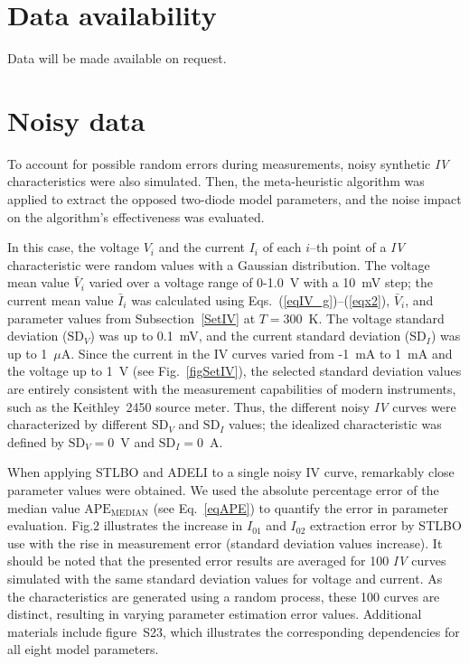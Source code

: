 \documentclass[a4paper,fleqn]{cas-sc}
\begin{document}
\section*{Data availability}
Data will be made available on request.


\appendix

\section{Noisy data}\label{Noisy}

To account for possible random errors during measurements, 
noisy synthetic \emph{IV} characteristics were also simulated.
Then, the meta-heuristic algorithm was applied to extract the opposed two-diode model parameters, 
and the noise impact on the algorithm's effectiveness was evaluated.

In this case, the voltage $V_i$ and the
current $I_i$ of each $i$--th point of a \emph{IV} characteristic were random values with a Gaussian distribution. 
The voltage mean value $\bar{V}_i$ varied over a voltage range of 0-1.0~V with a 10~mV step; 
the current mean value $\bar{I}_i$ was calculated using Eqs.~(\ref{eqIV_g})--(\ref{eqx2}), $\bar{V}_i$, 
and parameter values from Subsection~\ref{SetIV} at $T = 300$~K.
The voltage standard deviation ($\mathrm{SD}_V$) was up to 0.1~mV, 
and the current standard deviation ($\mathrm{SD}_I$) was up to 1~$\mu$A.
Since the current in the IV curves varied from -1~mA to 1~mA 
and the voltage up to 1~V (see Fig.~\ref{figSetIV}), the selected standard deviation values are entirely consistent 
with the measurement capabilities of modern instruments, such as the Keithley~2450 source meter.
Thus, the different noisy \emph{IV} curves were characterized by different $\mathrm{SD}_V$ and $\mathrm{SD}_I$ values; 
the idealized characteristic was defined by $\mathrm{SD}_V=0$~V and $\mathrm{SD}_I=0$~A.

When applying STLBO and ADELI to a single noisy IV curve, remarkably close parameter values were obtained.
We used the absolute percentage error of the median value $\mathrm{APE}_\mathrm{MEDIAN}$ 
(see Eq.~\ref{eqAPE}) to quantify the error in parameter evaluation.
Fig.2 illustrates the increase in $I_{01}$ and $I_{02}$ extraction error by STLBO use
with the rise in measurement error (standard deviation values increase).
It should be noted that the presented error results are averaged for 100 \emph{IV} curves 
simulated with the same standard deviation values for voltage and current. 
As the characteristics are generated using a random process, these 100 curves are distinct, 
resulting in varying parameter estimation error values. 
Additional materials include figure~S23, which illustrates the corresponding dependencies 
for all eight model parameters.
\end{document}
